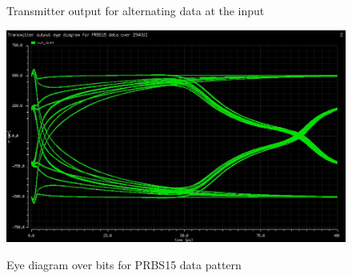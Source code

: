 \begin{figure}[H]
  \centering
  \caption{Transmitter output for alternating data at the input}
  \label{fig:alternating_data}
\end{figure}

\begin{figure}[H]
  \centering
  {\includegraphics[scale=0.6]{img/prbs_eye.jpg}}
  \caption{Eye diagram over \unit[2940]{bits} for PRBS15 data pattern}
  \label{fig:eye_prbs15}
\end{figure}

